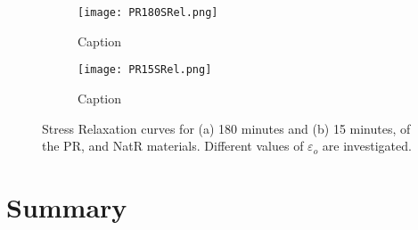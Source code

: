 \newpage
\begin{figure}[H]
    \vspace*{-2em}
    \centering
        \begin{subfigure}[b]{0.95\textwidth}
        \centering
        \texttt{[image: PR180SRel.png]}
        \caption{Caption}
        \label{sfig:PR180SRel}
    \end{subfigure}
    \begin{subfigure}[b]{0.95\textwidth}
        \centering
        \texttt{[image: PR15SRel.png]}
        \caption{Caption}
        \label{sfig:PR15SRel}
    \end{subfigure}
    \caption{Stress Relaxation curves for (a) 180 minutes and (b) 15 minutes, of the PR, and NatR materials. Different values of $\varepsilon_o$ are investigated.}
    \label{fig:PRSRel}
\end{figure}






\section{Summary}

